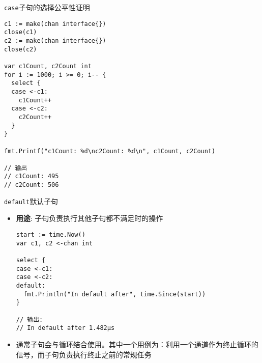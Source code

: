 \begin{frame}[fragile]{\texttt{case}子句的选择公平性证明}
\begin{lstlisting}
c1 := make(chan interface{})
close(c1)
c2 := make(chan interface{})
close(c2)

var c1Count, c2Count int
for i := 1000; i >= 0; i-- {
  select {
  case <-c1:
    c1Count++
  case <-c2:
    c2Count++
  }
}

fmt.Printf("c1Count: %d\nc2Count: %d\n", c1Count, c2Count)

// 输出
// c1Count: 495
// c2Count: 506
\end{lstlisting}    
\end{frame}

\begin{frame}[fragile]{\texttt{default}默认子句}
\begin{itemize}
    \item \textbf{用途}: 子句负责执行其他子句都不满足时的操作
\begin{lstlisting}
start := time.Now()
var c1, c2 <-chan int

select {
case <-c1:
case <-c2:
default:
  fmt.Println("In default after", time.Since(start))
}

// 输出:
// In default after 1.482µs
\end{lstlisting}
    \item 通常子句会与循环结合使用。其中一个\href{https://github.com/sammyne/concurrency-in-go/blob/master/chapter03/select/for_and_default.go}{用例}为：利用一个通道作为终止循环的信号，而子句负责执行终止之前的常规任务
\end{itemize}
\end{frame}
